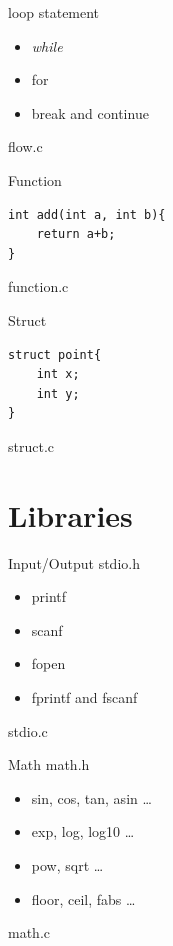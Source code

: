 \documentclass[UTF8]{beamer}
\begin{document}
\begin{frame}[t]{loop statement}
    \begin{itemize}
        \item \textit{while}
        \item for
        \item break and continue
    \end{itemize}
    flow.c
\end{frame}

\begin{frame}[t,fragile]{Function}
\begin{verbatim}
int add(int a, int b){
    return a+b;
}
\end{verbatim}
    function.c
\end{frame}

\begin{frame}[t,fragile]{Struct}
\begin{verbatim}
struct point{
    int x;
    int y;
}
\end{verbatim}
struct.c
\end{frame}


\section{Libraries}
\begin{frame}[t]{Input/Output}
    stdio.h
    \begin{itemize}
        \item printf
        \item scanf
        \item fopen
        \item fprintf and fscanf
    \end{itemize}
    stdio.c
\end{frame}

\begin{frame}[t]{Math}
    math.h
    \begin{itemize}
        \item sin, cos, tan, asin \ldots
        \item exp, log, log10 \ldots
        \item pow, sqrt \ldots
        \item floor, ceil, fabs \ldots
    \end{itemize}
    math.c
\end{frame}
\end{document}
